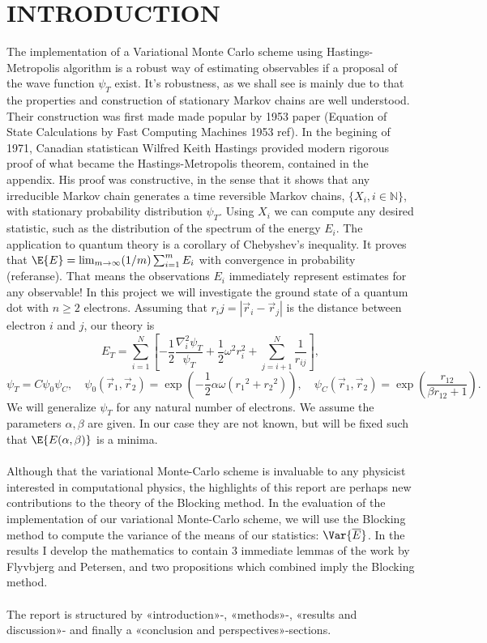 \documentclass[11pt,english,a4paper]{article}
\begin{document}
\section*{\uppercase{Introduction}}
The implementation of a Variational Monte Carlo scheme using Hastings-Metropolis algorithm is a robust way of estimating observables if a proposal of the wave function $\psi_T$ exist. It's robustness, as we shall see is mainly due to that the properties and construction of stationary Markov chains are well understood. Their construction was first made made popular by 1953 paper (Equation of State Calculations by Fast Computing Machines 1953 ref). In the begining of 1971, Canadian statistican Wilfred Keith Hastings provided modern rigorous proof of what became the Hastings-Metropolis theorem, contained in the appendix. His proof was constructive, in the sense that it shows that any irreducible Markov chain generates a time reversible Markov chains, $\{X_i, i \in \mathbb{N}\}$, with stationary probability distribution $\psi_T$. Using $X_i$ we can compute any desired statistic, such as the distribution of the spectrum of the energy $E_i$. The application to quantum theory is a corollary of Chebyshev's inequality. It proves that $\E{E} = \lim_{m \to \infty} (1/m) \sum_{i=1}^m E_i$ with convergence in probability (referanse). That means the observations $E_i$ immediately represent estimates for any observable! In this project we will investigate the ground state of a quantum dot with $n\geq 2$ electrons. Assuming that $r_ij = |\vec{r}_i - \vec r_j|$ is the distance between electron $i$ and $j$, our theory is 
\begin{equation}
E_T = \sum_{i=1}^N \left[ -\frac{1}{2} \frac{\nabla^2_i \psi_T}{\psi_T} + \frac{1}{2} \omega^2 r_i^2 + \sum_{j=i+1}^N \frac{1}{r_{ij}} \right], \label{eq:ET}
\end{equation}
\begin{equation}
\psi_T = C\psi_0 \psi_C, \quad  \psi_0(\vec{r}_1, \vec{r}_2) = \exp \left(-\frac{1}{2} \alpha  \omega  \left( {{r}_1}^2+  {{r}_2}^2\right)\right),  \quad  \psi_C(\vec{r}_1, \vec{r}_2) =  \exp \left( \frac{r_{  12}}{\beta  r_{  12}+1} \right). \label{eq:psiT}
\end{equation}
We will generalize $\psi_T$ for any natural number of electrons. We assume the parameters $\alpha,\beta$ are given. In our case they are not known, but will be fixed such that $\E{E(\alpha,\beta)}$ is a minima.\\
\\
Although that the variational Monte-Carlo scheme is invaluable to any physicist interested in computational physics, the highlights of this report are perhaps new contributions to the theory of the Blocking method. In the evaluation of the implementation of our variational Monte-Carlo scheme, we will use the Blocking method to compute the variance of the means of our statistics: $\Var{\overline{E}}$. In the results I develop the mathematics to contain 3 immediate lemmas of the work by Flyvbjerg and Petersen, and two propositions which combined imply the Blocking method.\\
\\
The report is structured by «introduction»-, «methods»-, «results and discussion»- and finally a «conclusion and perspectives»-sections.
\end{document}
